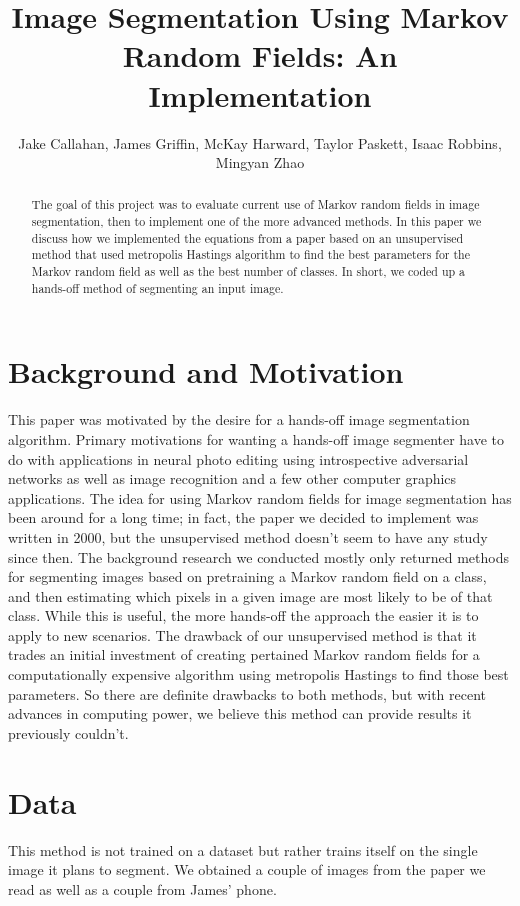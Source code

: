 \documentclass[11pt]{article}
\title{Image Segmentation Using Markov Random Fields: An Implementation}
\author{Jake Callahan, James Griffin, McKay Harward, Taylor Paskett, Isaac Robbins, Mingyan Zhao}
\begin{document}
\maketitle

\begin{abstract}
The goal of this project was to evaluate current use of Markov random fields in image segmentation, then to implement one of the more advanced methods. In this paper we discuss how we implemented the equations from a paper based on an unsupervised method that used metropolis Hastings algorithm to find the best parameters for the Markov random field as well as the best number of classes. In short, we coded up a hands-off method of segmenting an input image.
\end{abstract}

\section{Background and Motivation}
This paper was motivated by the desire for a hands-off image segmentation algorithm. Primary motivations for wanting a hands-off image segmenter have to do with applications in neural photo editing using introspective adversarial networks as well as image recognition and a few other computer graphics applications. The idea for using Markov random fields for image segmentation has been around for a long time; in fact, the paper we decided to implement was written in 2000, but the unsupervised method doesn’t seem to have any study since then. The background research we conducted mostly only returned methods for segmenting images based on pretraining a Markov random field on a class, and then estimating which pixels in a given image are most likely to be of that class. While this is useful, the more hands-off the approach the easier it is to apply to new scenarios. The drawback of our unsupervised method is that it trades an initial investment of creating pertained Markov random fields for a computationally expensive algorithm using metropolis Hastings to find those best parameters. So there are definite drawbacks to both methods, but with recent advances in computing power, we believe this method can provide results it previously couldn’t.

\section{Data}
This method is not trained on a dataset but rather trains itself on the single image it plans to segment. We obtained a couple of images from the paper we read as well as a couple from James’ phone.
\end{document}
